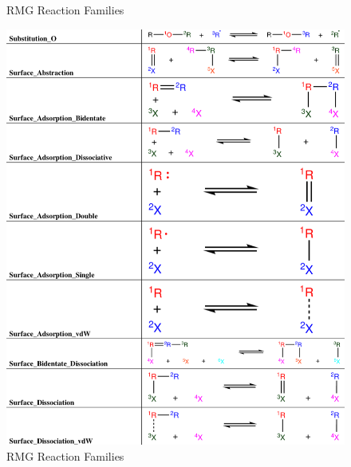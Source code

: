 \begin{figure}
     \caption{RMG Reaction Families \cite{Gao2016ReactionMechanisms}}
     \label{fig:rxnfam3}
 \end{figure}
 \begin{figure}
     \centering
     \includegraphics[scale=0.5, keepaspectratio]{images/rxn_fam6.png}
     \caption{RMG Reaction Families \cite{Gao2016ReactionMechanisms}}
     \label{fig:rxn_fam4}
 \end{figure}
 